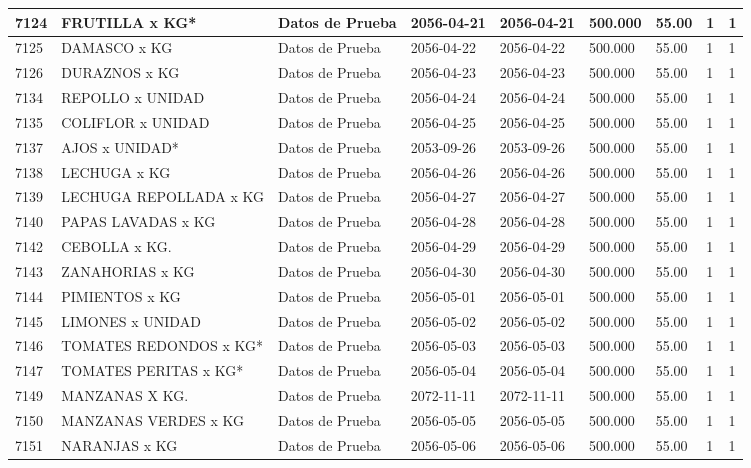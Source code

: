 \documentclass[a4paper,12pt]{article}
\begin{document}
\begin{landscape}
\begin{longtable}{|p{4cm}|p{2.5cm}|p{2.5cm}|p{1.8cm}|p{1.8cm}|p{1cm}|p{1cm}|p{3cm}|p{3cm}||}
7124 & FRUTILLA x KG* & Datos de Prueba & 2056-04-21 & 2056-04-21 & 500.000 & 55.00 & 1 & 1 \\ \hline 
7125 & DAMASCO x KG & Datos de Prueba & 2056-04-22 & 2056-04-22 & 500.000 & 55.00 & 1 & 1 \\ \hline 
7126 & DURAZNOS x KG & Datos de Prueba & 2056-04-23 & 2056-04-23 & 500.000 & 55.00 & 1 & 1 \\ \hline 
7134 & REPOLLO x UNIDAD & Datos de Prueba & 2056-04-24 & 2056-04-24 & 500.000 & 55.00 & 1 & 1 \\ \hline 
7135 & COLIFLOR x UNIDAD & Datos de Prueba & 2056-04-25 & 2056-04-25 & 500.000 & 55.00 & 1 & 1 \\ \hline 
7137 & AJOS x UNIDAD* & Datos de Prueba & 2053-09-26 & 2053-09-26 & 500.000 & 55.00 & 1 & 1 \\ \hline 
7138 & LECHUGA x KG & Datos de Prueba & 2056-04-26 & 2056-04-26 & 500.000 & 55.00 & 1 & 1 \\ \hline 
7139 & LECHUGA REPOLLADA x KG & Datos de Prueba & 2056-04-27 & 2056-04-27 & 500.000 & 55.00 & 1 & 1 \\ \hline 
7140 & PAPAS LAVADAS x KG & Datos de Prueba & 2056-04-28 & 2056-04-28 & 500.000 & 55.00 & 1 & 1 \\ \hline 
7142 & CEBOLLA x KG. & Datos de Prueba & 2056-04-29 & 2056-04-29 & 500.000 & 55.00 & 1 & 1 \\ \hline 
7143 & ZANAHORIAS x KG & Datos de Prueba & 2056-04-30 & 2056-04-30 & 500.000 & 55.00 & 1 & 1 \\ \hline 
7144 & PIMIENTOS x KG & Datos de Prueba & 2056-05-01 & 2056-05-01 & 500.000 & 55.00 & 1 & 1 \\ \hline 
7145 & LIMONES x UNIDAD & Datos de Prueba & 2056-05-02 & 2056-05-02 & 500.000 & 55.00 & 1 & 1 \\ \hline 
7146 & TOMATES REDONDOS x KG* & Datos de Prueba & 2056-05-03 & 2056-05-03 & 500.000 & 55.00 & 1 & 1 \\ \hline 
7147 & TOMATES PERITAS x KG* & Datos de Prueba & 2056-05-04 & 2056-05-04 & 500.000 & 55.00 & 1 & 1 \\ \hline 
7149 & MANZANAS X KG. & Datos de Prueba & 2072-11-11 & 2072-11-11 & 500.000 & 55.00 & 1 & 1 \\ \hline 
7150 & MANZANAS VERDES x KG & Datos de Prueba & 2056-05-05 & 2056-05-05 & 500.000 & 55.00 & 1 & 1 \\ \hline 
7151 & NARANJAS x KG & Datos de Prueba & 2056-05-06 & 2056-05-06 & 500.000 & 55.00 & 1 & 1 \\ \hline 

\end{longtable}
\end{landscape}
\end{document}
